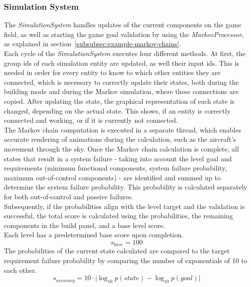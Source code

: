 \subsubsection{Simulation System}\label{subsubsec:simulation-system}
The \textit{SimulationSystem} handles updates of the current components on the game field, as well as starting the game goal
validation by using the \textit{MarkovProcessor}, as explained in section~\ref{subsubsec:example-markov-chains}.
\\
Each cycle of the \textit{SimulationSystem} executes four different methods.
At first, the group ids of each simulation entity are updated, as well their input ids.
This is needed in order for every entity to know to which other entities they are connected, which is necessary to correctly
update their states, both during the building mode and during the Markov simulation, where these connections are copied.
After updating the state, the graphical representation of each state is changed, depending on the actual state.
This shows, if an entity is correctly connected and working, or if it is currently not connected.
\\
The Markov chain computation is executed in a separate thread, which enables accurate rendering of animations during
the calculation, such as the aircraft's movement through the sky.
Once the Markov chain calculation is complete, all states that result in a system failure - taking into account the level goal and
requirements (minimum functional components, system failure probability, maximum out-of-control components) - are identified and
summed up to determine the system failure probability.
This probability is calculated separately for both out-of-control and passive failures.
\\
Subsequently, if the probabilities align with the level target and the validation is successful, the total score is calculated using the probabilities,
the remaining components in the build panel, and a base level score.
\\
Each level has a predetermined base score upon completion.
\begin{equation}
    s_{base} = 100
    \label{eq:base-score}
\end{equation}
The probabilities of the current state calculated are compared to the target requirement failure probability by comparing the number of exponentials of 10 to each other.
\begin{equation}
    s_{accuracy} = 10 \cdot \lvert \log_{10} p(state) - \log_{10} p(goal)\rvert
    \label{eq:accuracy-score}
\end{equation}
